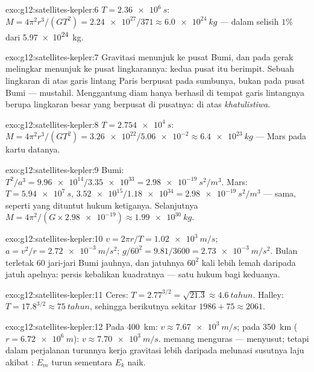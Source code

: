 \begin{solution}{exo:g12:satellites-kepler:6}
$T = \qty{2.36e6}{s}$: $M = 4\pi^2 r^3/(GT^2) =
\num{2.24e27}/371 \approx \qty{6.0e24}{kg}$ --- dalam selisih $1\%$ dari
\qty{5.97e24}{kg}.
\end{solution}

\begin{solution}{exo:g12:satellites-kepler:7}
Gravitasi menunjuk ke pusat Bumi, dan pada gerak melingkar  menunjuk ke pusat lingkarannya: kedua pusat itu berimpit. Sebuah
lingkaran di atas garis lintang Paris berpusat pada sumbunya, bukan pada
pusat Bumi --- mustahil. Menggantung diam hanya berhasil di tempat garis
lintangnya berupa lingkaran besar yang berpusat di pusatnya: di atas
\emph{khatulistiwa}.
\end{solution}

\begin{solution}{exo:g12:satellites-kepler:8}
$T = \qty{2.754e4}{s}$: $M = 4\pi^2 r^3/(GT^2) =
\num{3.26e22}/\num{5.06e-2} \approx \qty{6.4e23}{kg}$ --- Mars pada
kartu datanya.
\end{solution}

\begin{solution}{exo:g12:satellites-kepler:9}
Bumi: $T^2/a^3 = \num{9.96e14}/\num{3.35e33} =
\qty{2.98e-19}{s^2/m^3}$. Mars: $T = \qty{5.94e7}{s}$,
$\num{3.52e15}/\num{1.18e34} = \qty{2.98e-19}{s^2/m^3}$ --- sama, seperti
yang dituntut hukum ketiganya. Selanjutnya $M = 4\pi^2/(G \times \num{2.98e-19})
\approx \qty{1.99e30}{kg}$.
\end{solution}

\begin{solution}{exo:g12:satellites-kepler:10}
$v = 2\pi r/T = \qty{1.02e3}{m/s}$; $a = v^2/r =
\qty{2.72e-3}{m/s^2}$; $g/60^2 = 9.81/3600 = \qty{2.73e-3}{m/s^2}$.
Bulan terletak $60$ jari-jari Bumi jauhnya, dan jatuhnya $60^2$ kali
lebih lemah daripada jatuh apelnya: persis kebalikan kuadratnya --- satu
hukum bagi keduanya.
\end{solution}

\begin{solution}{exo:g12:satellites-kepler:11}
Ceres: $T = 2.77^{3/2} = \sqrt{21.3} \approx \qty{4.6}{tahun}$. Halley:
$T = 17.8^{3/2} \approx \qty{75}{tahun}$, sehingga  berikutnya sekitar
$1986 + 75 \approx 2061$.
\end{solution}

\begin{solution}{exo:g12:satellites-kepler:12}
Pada \qty{400}{km}: $v \approx \qty{7.67e3}{m/s}$; pada \qty{350}{km}
($r = \qty{6.72e6}{m}$): $v \approx \qty{7.70e3}{m/s}$.  memang
menguras  ---  menyusut; tetapi dalam perjalanan
turunnya kerja gravitasi lebih daripada melunasi susutnya laju akibat
: $E_m$ turun sementara $E_k$ naik.
\end{solution}

